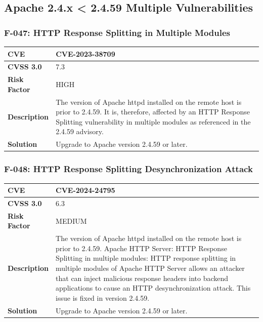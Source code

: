 %
%
\subsection{Apache 2.4.x < 2.4.59 Multiple Vulnerabilities}

\subsubsection{F-047: HTTP Response Splitting in Multiple Modules}
\begin{tabular}{|p{2.8cm}|p{12.2cm}|}
\hline
\textbf{CVE} & CVE-2023-38709 \\ \hline
\textbf{CVSS 3.0} & 7.3 \\ \hline
\textbf{Risk Factor} & HIGH \\ \hline
\textbf{Description} & The version of Apache httpd installed on the remote host is prior to 2.4.59. It is, therefore, affected by an HTTP Response Splitting vulnerability in multiple modules as referenced in the 2.4.59 advisory. \\ \hline
\textbf{Solution} & Upgrade to Apache version 2.4.59 or later. \\ \hline
\end{tabular}

\subsubsection{F-048: HTTP Response Splitting Desynchronization Attack}
\begin{tabular}{|p{2.8cm}|p{12.2cm}|}
\hline
\textbf{CVE} & CVE-2024-24795 \\ \hline
\textbf{CVSS 3.0} & 6.3 \\ \hline
\textbf{Risk Factor} & MEDIUM \\ \hline
\textbf{Description} & The version of Apache httpd installed on the remote host is prior to 2.4.59. Apache HTTP Server: HTTP Response Splitting in multiple modules: HTTP response splitting in multiple modules of Apache HTTP Server allows an attacker that can inject malicious response headers into backend applications to cause an HTTP desynchronization attack. This issue is fixed in version 2.4.59. \\ \hline
\textbf{Solution} & Upgrade to Apache version 2.4.59 or later. \\ \hline
\end{tabular}

